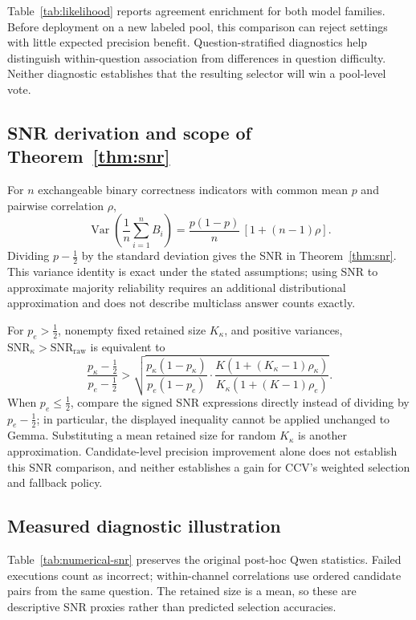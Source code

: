 \documentclass{article}
\begin{document}
Table~\ref{tab:likelihood} reports agreement enrichment for both model families. Before deployment on a new labeled pool, this comparison can reject settings with little expected precision benefit. Question-stratified diagnostics help distinguish within-question association from differences in question difficulty. Neither diagnostic establishes that the resulting selector will win a pool-level vote.

\subsection{SNR derivation and scope of Theorem~\ref{thm:snr}}

For $n$ exchangeable binary correctness indicators with common mean $p$ and pairwise correlation $\rho$,
\begin{equation}
 \operatorname{Var}\!\left(\frac{1}{n}\sum_{i=1}^n B_i\right)
 =\frac{p(1-p)}{n}\,[1+(n-1)\rho].
\end{equation}
Dividing $p-\tfrac12$ by the standard deviation gives the SNR in Theorem~\ref{thm:snr}. This variance identity is exact under the stated assumptions; using SNR to approximate majority reliability requires an additional distributional approximation and does not describe multiclass answer counts exactly.

For $p_e>\tfrac12$, nonempty fixed retained size $K_\kappa$, and positive variances, $\mathrm{SNR}_\kappa>\mathrm{SNR}_{\mathrm{raw}}$ is equivalent to
\begin{equation}
    \frac{p_\kappa-\tfrac{1}{2}}{p_e-\tfrac{1}{2}}
    >\sqrt{\frac{p_\kappa(1-p_\kappa)}{p_e(1-p_e)}
    \cdot\frac{K(1+(K_\kappa-1)\rho_\kappa)}{K_\kappa(1+(K-1)\rho_e)}}.
    \label{eq:snr_full_condition}
\end{equation}
When $p_e\leq\tfrac12$, compare the signed SNR expressions directly instead of dividing by $p_e-\tfrac12$; in particular, the displayed inequality cannot be applied unchanged to Gemma. Substituting a mean retained size for random $K_\kappa$ is another approximation. Candidate-level precision improvement alone does not establish this SNR comparison, and neither establishes a gain for CCV's weighted selection and fallback policy.

\subsection{Measured diagnostic illustration}
\label{app:numerical}

Table~\ref{tab:numerical-snr} preserves the original post-hoc Qwen statistics. Failed executions count as incorrect; within-channel correlations use ordered candidate pairs from the same question. The retained size is a mean, so these are descriptive SNR proxies rather than predicted selection accuracies.
\end{document}

